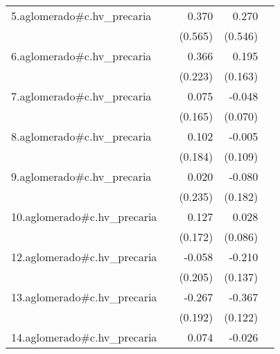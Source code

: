 {\begin{longtable}{l*{4}{D{.}{.}{-1}}}
\addlinespace
5.aglomerado#c.hv\_precaria&                     &       0.370         &       0.270         &                     \\
            &                     &     (0.565)         &     (0.546)         &                     \\
\addlinespace
6.aglomerado#c.hv\_precaria&                     &       0.366         &       0.195         &                     \\
            &                     &     (0.223)         &     (0.163)         &                     \\
\addlinespace
7.aglomerado#c.hv\_precaria&                     &       0.075         &      -0.048         &                     \\
            &                     &     (0.165)         &     (0.070)         &                     \\
\addlinespace
8.aglomerado#c.hv\_precaria&                     &       0.102         &      -0.005         &                     \\
            &                     &     (0.184)         &     (0.109)         &                     \\
\addlinespace
9.aglomerado#c.hv\_precaria&                     &       0.020         &      -0.080         &                     \\
            &                     &     (0.235)         &     (0.182)         &                     \\
\addlinespace
10.aglomerado#c.hv\_precaria&                     &       0.127         &       0.028         &                     \\
            &                     &     (0.172)         &     (0.086)         &                     \\
\addlinespace
12.aglomerado#c.hv\_precaria&                     &      -0.058         &      -0.210         &                     \\
            &                     &     (0.205)         &     (0.137)         &                     \\
\addlinespace
13.aglomerado#c.hv\_precaria&                     &      -0.267         &      -0.367\sym{**} &                     \\
            &                     &     (0.192)         &     (0.122)         &                     \\
\addlinespace
14.aglomerado#c.hv\_precaria&                     &       0.074         &      -0.026         &                     \\

\end{longtable}}
